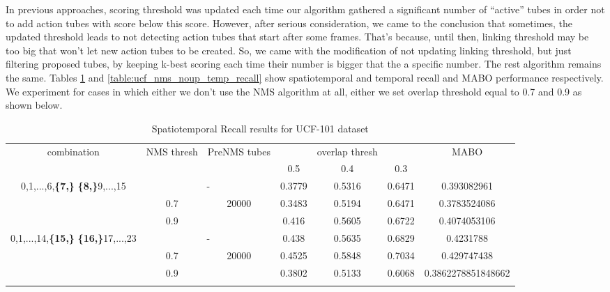 In previous approaches, scoring threshold was updated each time our algorithm gathered a significant number of ``active'' tubes in order not
to add action tubes with score below this score. However, after serious consideration, we came to the conclusion that sometimes, the updated
threshold leads to not detecting action tubes that start after some frames. That's because, until then, linking threshold may be too big that
won't let new action tubes to be created. So, we came with the modification of not updating linking threshold, but just filtering proposed
tubes, by keeping k-best scoring each time their number is bigger that the a specific number. The rest algorithm remains the same. Tables
\ref{table:ucf_nms_noup_recall} and \ref{table:ucf_nms_noup_temp_recall} show spatiotemporal and temporal recall and MABO performance respectively.
We experiment for cases in which either we don't use the  NMS algorithm at all, either we set overlap threshold equal to 0.7 and 0.9 as shown
below.

\begin{center}
  \setlength{\tabcolsep}{2pt}
\begin{longtable}{||c | c | c | c c c| c|}

  \hline
  \multirow{2}{*}{combination} & \multirow{2}{2.5em}{NMS thresh} & \multirow{2}{3.5em}{PreNMS tubes} &  {} &overlap thresh & {} & \multirow{2}{*}{MABO} \\
  {} & {} & {} &  0.5 &  0.4 & 0.3 & {}\\         
  \hline
  \multirow{3}{7em}{0,1,...,6,\textbf{\{7,\}}
  \textbf{\{8,\}}9,...,15 }   &   \multicolumn{2}{|c|}{-}     &  0.3779 & 0.5316 & 0.6471 & 0.393082961 \\
  \cline{2-7}
  {} & 0.7 &\multirow{2}{*}{20000}  & 0.3483  & 0.5194 & 0.6471 & 0.3783524086 \\
  \cline{2-2} \cline{4-7} 
  {} &  0.9   & {}   & 0.416 & 0.5605 & 0.6722 & 0.4074053106 \\
  \hline                                    
  \multirow{3}{7em}{0,1,...,14,\textbf{\{15,\}}
  \textbf{\{16,\}}17,...,23 }  &   \multicolumn{2}{|c|}{-} & 0.438 & 0.5635 & 0.6829 & 0.4231788 \\
  \cline{2-7}
  {} & 0.7 & \multirow{2}{*}{20000}   & 0.4525 & 0.5848 & 0.7034 & 0.429747438 \\
  \cline{2-2} \cline{4-7} 
  {} &  0.9   & {}   & 0.3802 & 0.5133 & 0.6068 & 0.3862278851848662 \\

  \hline                                    

  \caption{Spatiotemporal Recall results for UCF-101 dataset}
  \label{table:ucf_nms_noup_recall}
\end{longtable} 
\end{center}

